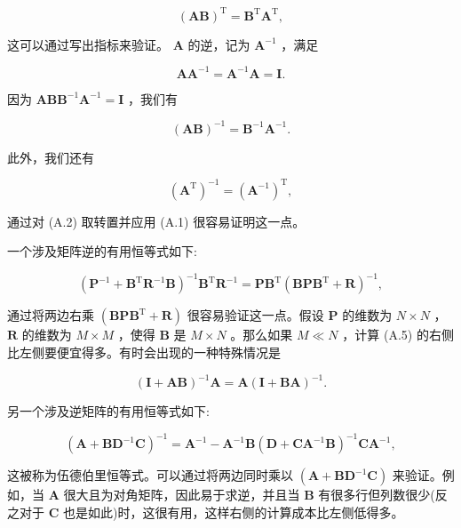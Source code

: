 \documentclass[10pt]{report}
\newcommand{\customfootnote}[1]{
  \let\thefootnote\relax\footnotetext{#1}
}
\begin{document}
\[
{\left( \mathbf{{AB}}\right) }^{\mathrm{T}} = {\mathbf{B}}^{\mathrm{T}}{\mathbf{A}}^{\mathrm{T}}, \tag{A.1}
\]

这可以通过写出指标来验证。 \(\mathbf{A}\) 的逆，记为 \({\mathbf{A}}^{-1}\) ，满足

\[
\mathbf{A}{\mathbf{A}}^{-1} = {\mathbf{A}}^{-1}\mathbf{A} = \mathbf{I}. \tag{A.2}
\]

因为 \(\mathbf{A}\mathbf{B}{\mathbf{B}}^{-1}{\mathbf{A}}^{-1} = \mathbf{I}\) ，我们有

\[
{\left( \mathbf{{AB}}\right) }^{-1} = {\mathbf{B}}^{-1}{\mathbf{A}}^{-1}. \tag{A.3}
\]

此外，我们还有

\[
{\left( {\mathbf{A}}^{\mathrm{T}}\right) }^{-1} = {\left( {\mathbf{A}}^{-1}\right) }^{\mathrm{T}}, \tag{A.4}
\]

通过对 (A.2) 取转置并应用 (A.1) 很容易证明这一点。

\customfootnote{

609

}

一个涉及矩阵逆的有用恒等式如下:

\[
{\left( {\mathbf{P}}^{-1} + {\mathbf{B}}^{\mathrm{T}}{\mathbf{R}}^{-1}\mathbf{B}\right) }^{-1}{\mathbf{B}}^{\mathrm{T}}{\mathbf{R}}^{-1} = \mathbf{P}{\mathbf{B}}^{\mathrm{T}}{\left( \mathbf{B}\mathbf{P}{\mathbf{B}}^{\mathrm{T}} + \mathbf{R}\right) }^{-1}, \tag{A.5}
\]

通过将两边右乘 \(\left( {{\mathbf{{BPB}}}^{\mathrm{T}} + \mathbf{R}}\right)\) 很容易验证这一点。假设 \(\mathbf{P}\) 的维数为 \(N \times  N\) ， \(\mathbf{R}\) 的维数为 \(M \times  M\) ，使得 \(\mathbf{B}\) 是 \(M \times  N\) 。那么如果 \(M \ll  N\) ，计算 (A.5) 的右侧比左侧要便宜得多。有时会出现的一种特殊情况是

\[
{\left( \mathbf{I} + \mathbf{{AB}}\right) }^{-1}\mathbf{A} = \mathbf{A}{\left( \mathbf{I} + \mathbf{{BA}}\right) }^{-1}. \tag{A.6}
\]

另一个涉及逆矩阵的有用恒等式如下:

\[
{\left( \mathbf{A} + {\mathbf{{BD}}}^{-1}\mathbf{C}\right) }^{-1} = {\mathbf{A}}^{-1} - {\mathbf{A}}^{-1}\mathbf{B}{\left( \mathbf{D} + {\mathbf{{CA}}}^{-1}\mathbf{B}\right) }^{-1}{\mathbf{{CA}}}^{-1}, \tag{A.7}
\]

这被称为伍德伯里恒等式。可以通过将两边同时乘以 \(\left( {\mathbf{A} + {\mathbf{{BD}}}^{-1}\mathbf{C}}\right)\) 来验证。例如，当 \(\mathbf{A}\) 很大且为对角矩阵，因此易于求逆，并且当 \(\mathbf{B}\) 有很多行但列数很少(反之对于 \(\mathbf{C}\) 也是如此)时，这很有用，这样右侧的计算成本比左侧低得多。
\end{document}
